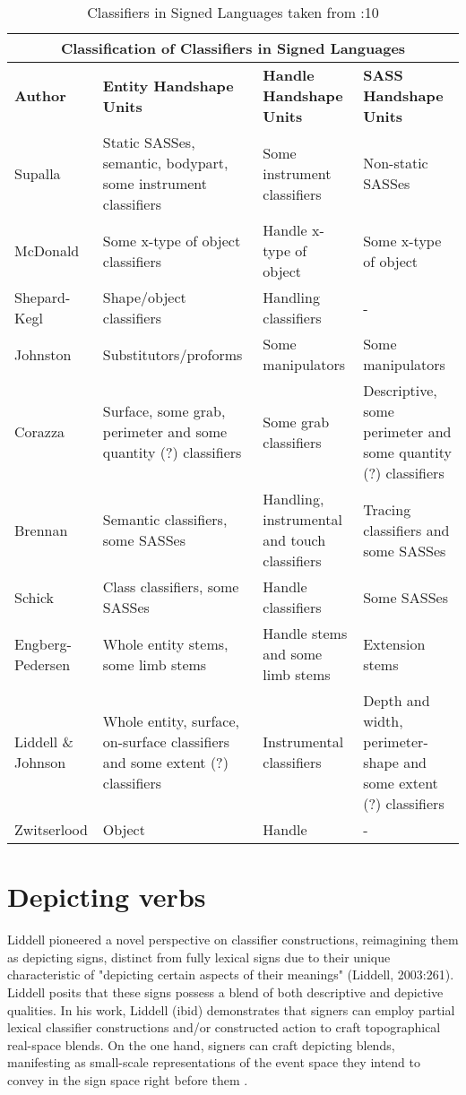 \begin{table}[H]
 \centering  
 \begin{tabular}{ |p{2cm}|p{3cm}|p{3cm}|p{3cm}|}
\hline
\multicolumn{4}{|c|}{\textbf{Classification of Classifiers in Signed Languages}} \\
\hline
 \textbf{Author} & \textbf{Entity Handshape Units} & \textbf{Handle Handshape Units} 
 & \textbf{SASS Handshape Units} \\
 \hline
 Supalla & Static SASSes, semantic, bodypart, some instrument classifiers & Some 
 instrument classifiers & Non-static SASSes \\
 \hline
 McDonald & Some x-type of object classifiers & Handle x-type of object & 
 Some x-type of object \\
 \hline
 Shepard-Kegl & Shape/object classifiers & Handling classifiers & - \\
 \hline
 Johnston & Substitutors/proforms & Some manipulators & Some manipulators \\
 \hline
 Corazza  & Surface, some grab, perimeter and some quantity (?) classifiers
 & Some grab classifiers & Descriptive, some perimeter and some quantity (?) 
 classifiers \\ 
 \hline
 Brennan & Semantic classifiers, some SASSes & Handling, instrumental and
touch classifiers & Tracing classifiers and some SASSes \\
\hline
Schick & Class classifiers, some SASSes & Handle classifiers & Some SASSes \\
\hline
Engberg-Pedersen & Whole entity stems, some limb stems & Handle stems and some limb 
stems & Extension stems \\
\hline
Liddell \& Johnson & Whole entity, surface, on-surface classifiers and some
extent (?) classifiers & Instrumental classifiers &  Depth and width,
perimeter-shape and some extent (?) classifiers \\
\hline
Zwitserlood & Object & Handle & - \\
\hline
\end{tabular}
\caption{Classifiers in Signed Languages taken from \parencite{schembri2003}:10}
\label{tab:classifiers_signed_languages}
\end{table}


\section{Depicting verbs}

Liddell pioneered a novel perspective on classifier constructions, reimagining them as depicting signs, distinct from fully lexical signs due to their unique characteristic of "depicting certain aspects of their meanings" (Liddell, 2003:261). Liddell posits that these signs possess a blend of both descriptive and depictive qualities. In his work, Liddell (ibid) demonstrates that signers can employ partial lexical classifier constructions and/or constructed action to craft topographical real-space blends. On the one hand, signers can craft depicting blends, manifesting as small-scale representations of the event space they intend to convey in the sign space right before them \parencite{beukeleers2022show}.\\

